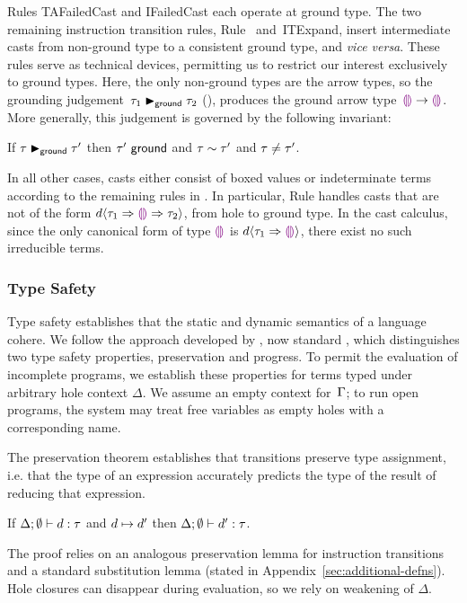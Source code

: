 Rules {TAFailedCast} and {IFailedCast} each operate at ground type. 
%
The two remaining instruction transition rules, Rule~
and~{ITExpand}, insert intermediate casts from non-ground type to a
consistent ground type, and \emph{vice versa}.
%
These rules serve as technical devices, permitting us to restrict our
interest exclusively to ground types.
%
Here, the only non-ground types are the arrow types, so the grounding
judgement~$\tau_1 \blacktriangleright_{\mathsf{ground}} \tau_2$ (),
produces the ground arrow type~$\textcolor{violet}{\llparenthesis}\textcolor{violet}{\rrparenthesis} \rightarrow \textcolor{violet}{\llparenthesis}\textcolor{violet}{\rrparenthesis}$.
%
More generally, this judgement is governed by the following invariant:
\begin{lem}[Grounding] 
  If $\tau \blacktriangleright_{\mathsf{ground}} \tau'$
  then $\tau'~\mathsf{ground}$
  and $\tau \sim \tau'$
  and $\tau\neq\tau'$.
\end{lem}

In all other cases, casts either consist of boxed values or
indeterminate terms according to the remaining rules
in .
%
In particular, Rule  handles casts that are not of
the form $d \langle{\tau_1}\Rightarrow{\textcolor{violet}{\llparenthesis}\textcolor{violet}{\rrparenthesis}}\Rightarrow{\tau_2}\rangle$, from hole to
ground type.
%
In the cast calculus, since the only canonical form of type $\textcolor{violet}{\llparenthesis}\textcolor{violet}{\rrparenthesis}$
is $d \langle{\tau_1}\Rightarrow{\textcolor{violet}{\llparenthesis}\textcolor{violet}{\rrparenthesis}}\rangle$, there exist no such
irreducible terms.

\subsubsection{Type Safety} 
%
Type safety establishes that the static and dynamic semantics of a
language cohere.
%
We follow the approach developed by \citet{wright94:_type_soundness},
now standard \cite{pfpl}, which distinguishes two type safety
properties, preservation and progress.
%
To permit the evaluation of incomplete programs, we establish these
properties for terms typed under arbitrary hole context $\Delta$.
%
We assume an empty context for~$\Gamma$; to run open programs, the
system may treat free variables as empty holes with a corresponding
name.

The preservation theorem establishes that transitions preserve type
assignment, i.e. that the type of an expression accurately predicts
the type of the result of reducing that expression.

\begin{thm}[Preservation]
  If $\Delta; \emptyset \vdash d : \tau$ and
  $d \mapsto d'$ then
  $\Delta; \emptyset \vdash d' : \tau$.
\end{thm}
\noindent
%
The proof relies on an analogous preservation lemma for instruction
transitions and a standard substitution lemma (stated in
Appendix~\ref{sec:additional-defns}).
%
Hole closures can disappear during evaluation, so we rely on weakening
of $\Delta$.

